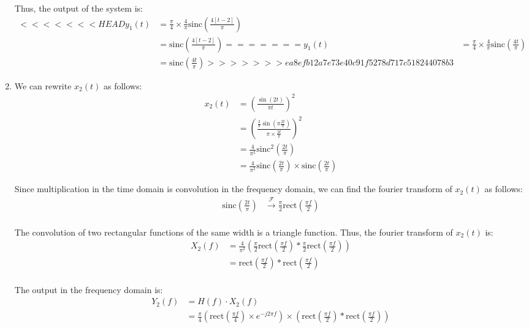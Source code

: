 \documentclass{article}
\begin{document}
\begin{enumerate}[label=2.\arabic*]
    Thus, the output of the system is:
    \begin{align*}
<<<<<<< HEAD
        y_1(t) &= \frac{\pi}{4} \times \frac{4}{\pi} \text{sinc}\left(\frac{4[t-2]}{\pi}\right) \\
        &= \boxed{\text{sinc}\left(\frac{4[t-2]}{\pi}\right)}
=======
        y_1(t) &= \frac{\pi}{4} \times \frac{4}{\pi} \text{sinc}\left(\frac{4t}{\pi}\right) \\
        &= \boxed{\text{sinc}\left(\frac{4t}{\pi}\right)}
>>>>>>> ea8efb12a7e73e40c91f5278d717c518244078b3
    \end{align*}

    \item We can rewrite $x_2(t)$ as follows:   
    \begin{align*}
        x_2(t) &= \left(\frac{\sin(2t)}{\pi t}\right)^2 \\
        &= \left(\frac{\frac{2}{\pi} \sin\left(\pi \frac{2t}{\pi}\right)}{\pi \times \frac{2t}{\pi}}\right)^2 \\
        &= \frac{4}{\pi^2} \text{sinc}^2\left(\frac{2t}{\pi}\right) \\
        &= \frac{4}{\pi^2} \text{sinc}\left(\frac{2t}{\pi}\right) \times \text{sinc}\left(\frac{2t}{\pi}\right)
    \end{align*}

    Since multiplication in the time domain is convolution in the frequency domain, we can find the fourier transform of $x_2(t)$ as follows:
    \begin{align*}
        \text{sinc}\left(\frac{2t}{\pi}\right) &\xrightarrow{\mathcal{F}} \frac{\pi}{2}\text{rect}\left(\frac{\pi f}{2}\right) \\
    \end{align*}

    The convolution of two rectangular functions of the same width is a triangle function. Thus, the fourier transform of $x_2(t)$ is:
    \begin{align*}
        X_2(f) &= \frac{4}{\pi^2}\left(
            \frac{\pi}{2}\text{rect}\left(\frac{\pi f}{2}\right) \ast \frac{\pi}{2}\text{rect}\left(\frac{\pi f}{2}\right)
        \right) \\
        &= \text{rect}\left(\frac{\pi f}{2}\right) \ast \text{rect}\left(\frac{\pi f}{2}\right) \\
    \end{align*}

    The output in the frequency domain is:
    \begin{align*}
        Y_2(f) &= H(f) \cdot X_2(f) \\
        &= \frac{\pi}{4}\left( \text{rect}\left(\frac{\pi f}{4}\right) \times e^{-j2\pi f}\right) \times \left(\text{rect}\left(\frac{\pi f}{2}\right) \ast \text{rect}\left(\frac{\pi f}{2}\right)\right) \\
    \end{align*}


\end{enumerate}
\end{document}
